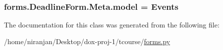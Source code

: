 \subsubsection[{\texorpdfstring{model}{model}}]{\setlength{\rightskip}{0pt plus 5cm}forms.\+Deadline\+Form.\+Meta.\+model = {\bf Events}\hspace{0.3cm}{\ttfamily [static]}}\hypertarget{classforms_1_1_deadline_form_1_1_meta_a714361d72114f4856d3d60201666e30e}{}\label{classforms_1_1_deadline_form_1_1_meta_a714361d72114f4856d3d60201666e30e}


The documentation for this class was generated from the following file\+:\begin{DoxyCompactItemize}
\item 
/home/niranjan/\+Desktop/dox-\/proj-\/1/tcourse/\hyperlink{forms_8py}{forms.\+py}\end{DoxyCompactItemize}
